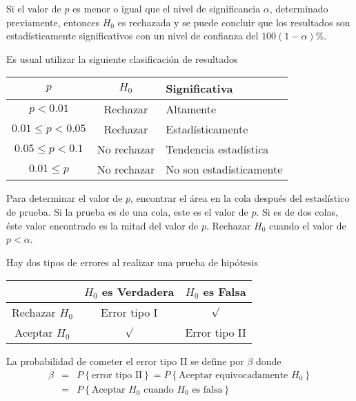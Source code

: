 \begin{Def}
Si el valor de $p$ es menor o igual que el nivel de significancia $\alpha$, determinado previamente, entonces $H_{0}$ es rechazada y se puede concluir que los resultados son estad\'isticamente significativos con un nivel de confianza del $100\left(1-\alpha\right)\%$.
\end{Def}
Es usual utilizar la siguiente clasificaci\'on de resultados


\begin{tabular}{|c||c|l|}\hline
$p$& $H_{0}$&Significativa\\\hline\hline
$p<0.01$&Rechazar &Altamente\\\hline
$0.01\leq p<0.05$ & Rechazar&Estad\'isticamente\\\hline
$0.05\leq p <0.1$ & No rechazar & Tendencia estad\'istica\\\hline
$0.01\leq p$ & No rechazar & No son estad\'isticamente\\\hline
\end{tabular}






\begin{Note}
Para determinar el valor de $p$, encontrar el \'area en la cola despu\'es del estad\'istico de prueba. Si la prueba es de una cola, este es el valor de $p$. Si es de dos colas, \'este valor encontrado es la mitad del valor de $p$. Rechazar $H_{0}$ cuando el valor de $p<\alpha$.
\end{Note}

Hay dos tipos de errores al realizar una prueba de hip\'otesis
\begin{center}
\begin{tabular}{c|cc}
& $H_{0}$ es Verdadera & $H_{0}$ es Falsa\\\hline\hline
Rechazar $H_{0}$ & Error tipo I & $\surd$\\
Aceptar $H_{0}$ & $\surd$ & Error tipo II
\end{tabular}
\end{center}






\begin{Def}
La probabilidad de cometer el error tipo II se define por $\beta$ donde
\begin{eqnarray*}
\beta&=&P\left\{\textrm{error tipo II}\right\}=P\left\{\textrm{Aceptar equivocadamente }H_{0}\right\}\\
&=&P\left\{\textrm{Aceptar }H_{0}\textrm{ cuando }H_{0}\textrm{ es falsa}\right\}
\end{eqnarray*}
\end{Def}


